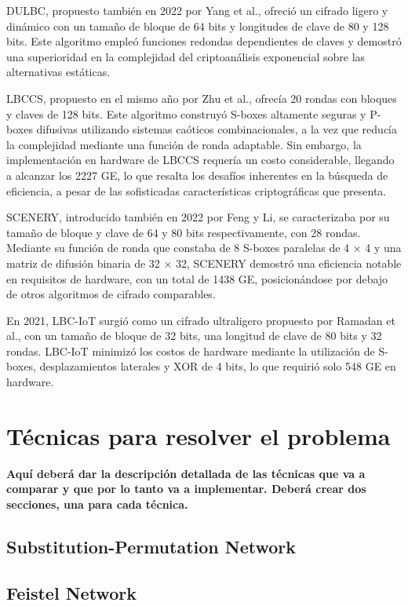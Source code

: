\documentclass[conference]{IEEEtran}
\begin{document}
DULBC, propuesto también en 2022 por Yang et al.\cite{DULBC}, ofreció un cifrado ligero y dinámico con un tamaño de bloque de 64 bits y longitudes de clave de 80 y 128 bits. Este algoritmo empleó funciones redondas dependientes de claves y demostró una superioridad en la complejidad del criptoanálisis exponencial sobre las alternativas estáticas.

LBCCS, propuesto en el mismo año por Zhu et al.\cite{LBCCS}, ofrecía 20 rondas con bloques y claves de 128 bits. Este algoritmo construyó S-boxes altamente seguras y P-boxes difusivas utilizando sistemas caóticos combinacionales, a la vez que reducía la complejidad mediante una función de ronda adaptable. Sin embargo, la implementación en hardware de LBCCS requería un costo considerable, llegando a alcanzar los 2227 GE, lo que resalta los desafíos inherentes en la búsqueda de eficiencia, a pesar de las sofisticadas características criptográficas que presenta.

SCENERY, introducido también en 2022 por Feng y Li\cite{SCENERY}, se caracterizaba por su tamaño de bloque y clave de 64 y 80 bits respectivamente, con 28 rondas. Mediante su función de ronda que constaba de 8 S-boxes paralelas de 4 × 4 y una matriz de difusión binaria de 32 × 32, SCENERY demostró una eficiencia notable en requisitos de hardware, con un total de 1438 GE, posicionándose por debajo de otros algoritmos de cifrado comparables.

En 2021, LBC-IoT surgió como un cifrado ultraligero propuesto por Ramadan et al.\cite{LBC-IoT}, con un tamaño de bloque de 32 bits, una longitud de clave de 80 bits y 32 rondas. LBC-IoT minimizó los costos de hardware mediante la utilización de S-boxes, desplazamientos laterales y XOR de 4 bits, lo que requirió solo 548 GE en hardware.


\section{Técnicas para resolver el problema} \label{tecnicas}
\textbf{Aquí deberá dar la descripción detallada de las técnicas que va a comparar y que por lo tanto va a implementar. Deberá crear dos secciones, una para cada técnica.}

\subsection{Substitution-Permutation Network}
\subsection{Feistel Network}
\end{document}
